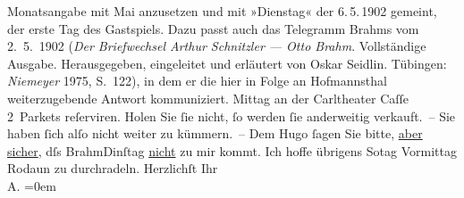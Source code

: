 \begin{ledgroupsized}[t]{13cm}
{{{                  Monatsangabe mit Mai anzusetzen und mit »Dienstag« der 6. 5. 1902 gemeint, der erste Tag des
                  Gastspiels. Dazu passt auch das Telegramm Brahms vom 2. 5. 1902 (\emph{Der Briefwechsel Arthur Schnitzler — Otto Brahm}.
                     Vollständige Ausgabe. Herausgegeben, eingeleitet und erläutert von Oskar
                     Seidlin. Tübingen: \emph{Niemeyer}{ }1975, S. 122), in dem er die hier in Folge an Hofmannsthal weiterzugebende Antwort
                  kommuniziert.}}}\label{K_L01217_1h}{ }Mittag an der Carltheater Caſſe
               2 Parkets reſerviren. Holen Sie ſie nicht, ſo werden ſie anderweitig {\pb}verkauft. – Sie haben ſich alſo nicht weiter zu
               kümmern. –\pend
           \pstart
           Dem Hugo ſagen Sie bitte, \uline{aber sicher}, dſs BrahmDinſtag{ }\uline{nicht} zu mir kommt.\pend
           \pstart
           Ich hoffe übrigens So{\geminationn}tag{ }Vormittag{ }Rodaun zu durchradeln.\pend
           \pstart
           Herzlichſt Ihr{\\[\baselineskip]}\spacefill\mbox{A.}\pend
           \leftskip=0em{}
         
         \endnumbering{}\end{ledgroupsized}  \newcommand{\dateiname}{L01217}\newcommand{\titel}{Arthur Schnitzler an Richard Beer-Hofmann, 2. [5.?] 1902}\newcommand{\editorInnen}{Martin Anton Müller und Gerd-Hermann Susen}
      